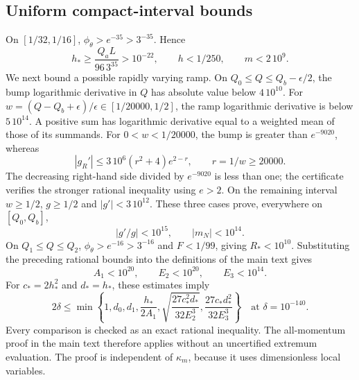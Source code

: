 \documentclass[aps,prd,reprint,onecolumn,notitlepage,nofootinbib,longbibliography,floatfix]{revtex4-2}
\theoremstyle{scstyle}
\theoremstyle{definition}
\theoremstyle{remark}
\newcommand{\kap}{\kappa_m}
\begin{document}
\subsection{Uniform compact-interval bounds}
On $[1/32,1/16]$, $\phi_\theta>e^{-35}>3^{-35}$. Hence
\begin{equation}
 h_*\ge\frac{Q_aL}{96\,3^{35}}>10^{-22},\qquad
 h<1/250,\qquad m<2\,10^9.
\end{equation}
We next bound a possible rapidly varying ramp. On
$Q_0\le Q\le Q_b-\epsilon/2$, the bump logarithmic derivative in
$Q$ has absolute value below $4\,10^{10}$. For
$w=(Q-Q_b+\epsilon)/\epsilon\in[1/20000,1/2]$, the ramp logarithmic
derivative is below $5\,10^{14}$. A positive sum has logarithmic
derivative equal to a weighted mean of those of its summands.
For $0<w<1/20000$, the bump is greater than $e^{-9020}$, whereas
\begin{equation}
 |g_R'|\le3\,10^6(r^2+4)e^{2-r},\qquad r=1/w\ge20000.
\end{equation}
The decreasing right-hand side divided by $e^{-9020}$ is less than one;
the certificate verifies the stronger rational inequality using
$e>2$. On the remaining interval $w\ge1/2$, $g\ge1/2$ and
$|g'|<3\,10^{12}$. These three cases prove, everywhere on
$[Q_0,Q_b]$,
\begin{equation}
 |g'/g|<10^{15},\qquad |m_N|<10^{14}.
\end{equation}
On $Q_1\le Q\le Q_2$, $\phi_\theta>e^{-16}>3^{-16}$ and
$F<1/99$, giving $R_*<10^{10}$. Substituting the preceding rational
bounds into the definitions of the main text gives
\begin{equation}
 A_1<10^{20},\qquad E_2<10^{20},\qquad E_3<10^{14}.
 \label{eq:certCompact}
\end{equation}
For $c_*=2h_*^2$ and $d_*=h_*$, these estimates imply
\begin{equation}
 2\delta\le\min\left\{1,d_0,d_1,\frac{h_*}{2A_1},
 \sqrt{\frac{27c_*^2d_*}{32E_2^3}},\frac{27c_*d_*^2}{32E_3^3}\right\}
 \quad\text{at }\delta=10^{-140}.
\end{equation}
Every comparison is checked as an exact rational inequality. The
all-momentum proof in the main text therefore applies without an
uncertified extremum evaluation. The proof is independent of $\kap$,
because it uses dimensionless local variables.
\end{document}
